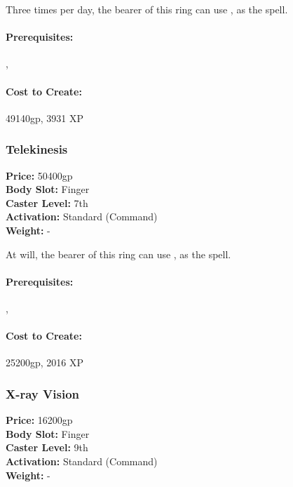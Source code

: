 Three times per day, the bearer of this ring can use , as the spell.


\paragraph{Prerequisites:} , 

\paragraph{Cost to Create:} 49140gp, 3931 XP
\subsubsection{Telekinesis}
\label{Item:Telekinesis}
   \textbf{Price:} 50400gp
\\ \textbf{Body Slot:} Finger
\\ \textbf{Caster Level:} 7th
\\ \textbf{Activation:} Standard (Command)
\\ \textbf{Weight:} -

At will, the bearer of this ring can use , as the spell.


\paragraph{Prerequisites:} , 

\paragraph{Cost to Create:} 25200gp, 2016 XP
\subsubsection{X-ray Vision}
\label{Item:XRayVision}
   \textbf{Price:} 16200gp
\\ \textbf{Body Slot:} Finger
\\ \textbf{Caster Level:} 9th
\\ \textbf{Activation:} Standard (Command)
\\ \textbf{Weight:} -

